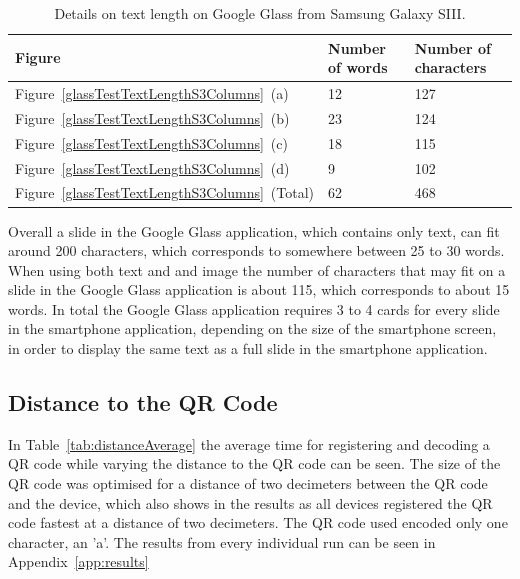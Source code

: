 	\begin{table}[ht!]
    		\caption{Details on text length on Google Glass from Samsung Galaxy SIII.} \label{tab:glassTestTextLengthS3ColumnsTable}
		\centering \begin{tabularx}{\textwidth}{l|X|X} \hline
		\textbf{Figure} & \textbf{Number of words} & \textbf{Number of characters} \\ \hline \hline
       
		Figure~\ref{glassTestTextLengthS3Columns}~(a)	&12	&127	\\ \hline
		Figure~\ref{glassTestTextLengthS3Columns}~(b)	&23	&124	\\ \hline
		Figure~\ref{glassTestTextLengthS3Columns}~(c)	&18	&115	\\ \hline
		Figure~\ref{glassTestTextLengthS3Columns}~(d)	&9	&102	\\ \hline
		Figure~\ref{glassTestTextLengthS3Columns}~(Total)	&62	&468	\\ \hline
		
		\end{tabularx}
	\end{table}

Overall a slide in the Google Glass application, which contains only text, can fit around 200 characters, which corresponds to somewhere between 25 to 30 words. When using both text and and image the number of characters that may fit on a slide in the Google Glass application is about 115, which corresponds to about 15 words. In total the Google Glass application requires 3 to 4 cards for every slide in the smartphone application, depending on the size of the smartphone screen, in order to display the same text as a full slide in the smartphone application.

\subsection{Distance to the QR Code}

In Table~\ref{tab:distanceAverage} the average time for registering and decoding a QR code while varying the distance to the QR code can be seen. The size of the QR code was optimised for a distance of two decimeters between the QR code and the device, which also shows in the results as all devices registered the QR code fastest at a distance of two decimeters. The QR code used encoded only one character, an 'a'. The results from every individual run can be seen in Appendix~\ref{app:results}

